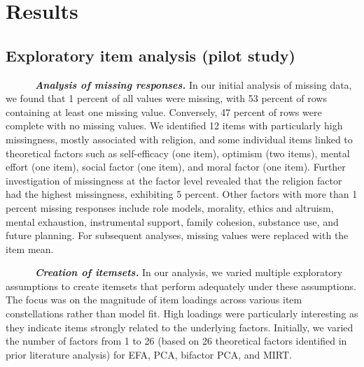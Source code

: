 \documentclass[
  man,floatsintext]{apa7}
\begin{document}
\section{Results}\label{results}

\subsection{Exploratory item analysis (pilot study)}\label{exploratory-item-analysis-pilot-study}

~~~~~~\textbf{\emph{Analysis of missing responses.}} In our initial analysis of missing data, we found that 1 percent of all values were missing, with 53 percent of rows containing at least one missing value. Conversely, 47 percent of rows were complete with no missing values. We identified 12 items with particularly high missingness, mostly associated with religion, and some individual items linked to theoretical factors such as self-efficacy (one item), optimism (two items), mental effort (one item), social factor (one item), and moral factor (one item). Further investigation of missingness at the factor level revealed that the religion factor had the highest missingness, exhibiting 5 percent. Other factors with more than 1 percent missing responses include role models, morality, ethics and altruism, mental exhaustion, instrumental support, family cohesion, substance use, and future planning. For subsequent analyses, missing values were replaced with the item mean.

~~~~~~\textbf{\emph{Creation of itemsets.}} In our analysis, we varied multiple exploratory assumptions to create itemsets that perform adequately under these assumptions. The focus was on the magnitude of item loadings across various item constellations rather than model fit. High loadings were particularly interesting as they indicate items strongly related to the underlying factors. Initially, we varied the number of factors from 1 to 26 (based on 26 theoretical factors identified in prior literature analysis) for EFA, PCA, bifactor PCA, and MIRT.
\end{document}
